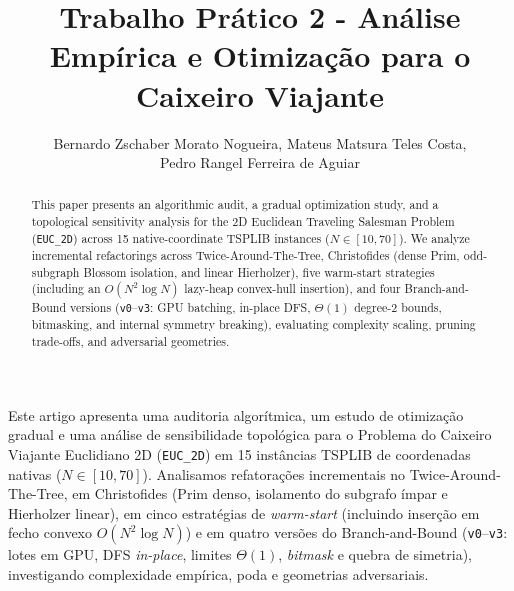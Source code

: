 \documentclass[12pt]{article}
\title{Trabalho Prático 2 - Análise Empírica e Otimização para o Caixeiro Viajante}
\author{Bernardo Zschaber Morato Nogueira\inst{1}, Mateus Matsura Teles Costa\inst{1},\\
  Pedro Rangel Ferreira de Aguiar\inst{1}}
\begin{document}
\maketitle

\begin{abstract}
This paper presents an algorithmic audit, a gradual optimization study, and a topological
sensitivity analysis for the 2D Euclidean Traveling Salesman Problem (\texttt{EUC\_2D}) across
15 native-coordinate TSPLIB instances ($N \in [10, 70]$). We analyze incremental refactorings
across Twice-Around-The-Tree, Christofides (dense Prim, odd-subgraph Blossom isolation, and
linear Hierholzer), five warm-start strategies (including an $O(N^2 \log N)$ lazy-heap
convex-hull insertion), and four Branch-and-Bound versions (\texttt{v0}--\texttt{v3}: GPU
batching, in-place DFS, $\Theta(1)$ degree-2 bounds, bitmasking, and internal symmetry
breaking), evaluating complexity scaling, pruning trade-offs, and adversarial geometries.
\end{abstract}

\begin{resumo}
Este artigo apresenta uma auditoria algorítmica, um estudo de otimização gradual e uma análise
de sensibilidade topológica para o Problema do Caixeiro Viajante Euclidiano 2D
(\texttt{EUC\_2D}) em 15 instâncias TSPLIB de coordenadas nativas ($N \in [10, 70]$).
Analisamos refatorações incrementais no Twice-Around-The-Tree, em Christofides (Prim denso,
isolamento do subgrafo ímpar e Hierholzer linear), em cinco estratégias de \textit{warm-start}
(incluindo inserção em fecho convexo $O(N^2 \log N)$) e em quatro versões do Branch-and-Bound
(\texttt{v0}--\texttt{v3}: lotes em GPU, DFS \textit{in-place}, limites $\Theta(1)$,
\textit{bitmask} e quebra de simetria), investigando complexidade empírica, poda e geometrias
adversariais.
\end{resumo}













\end{document}
